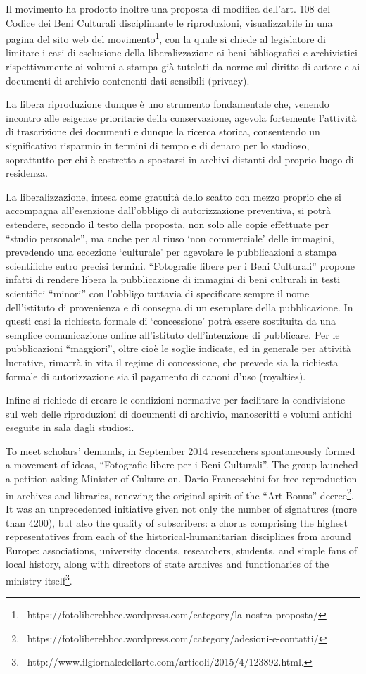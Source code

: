 \documentclass[amsthm,ebook]{saparticle}
\begin{document}
Il movimento ha prodotto inoltre una proposta di modifica dell’art. 108 del Codice dei Beni Culturali disciplinante le
riproduzioni, visualizzabile in una pagina del sito web del
movimento\footnote{\ https://fotoliberebbcc.wordpress.com/category/la-nostra-proposta/}, con la quale si chiede al
legislatore di limitare i casi di esclusione della liberalizzazione ai beni bibliografici e archivistici
rispettivamente ai volumi a stampa già tutelati da norme sul diritto di autore e ai documenti di archivio contenenti
dati sensibili (privacy). 

La libera riproduzione dunque è uno strumento fondamentale che, venendo incontro alle esigenze prioritarie della
conservazione, agevola fortemente l’attività di trascrizione dei documenti e dunque la ricerca storica, consentendo un
significativo risparmio in termini di tempo e di denaro per lo studioso, soprattutto per chi è costretto a spostarsi in
archivi distanti dal proprio luogo di residenza. 

La liberalizzazione, intesa come gratuità dello scatto con mezzo proprio che si accompagna all’esenzione dall’obbligo di
autorizzazione preventiva, si potrà estendere, secondo il testo della proposta, non solo alle copie effettuate per
“studio personale”, ma anche per al riuso ‘non commerciale’ delle immagini, prevedendo una eccezione ‘culturale’ per
agevolare le pubblicazioni a stampa scientifiche entro precisi termini. “Fotografie libere per i Beni Culturali”
propone infatti di rendere libera la pubblicazione di immagini di beni culturali in testi scientifici “minori” con
l’obbligo tuttavia di specificare sempre il nome dell’istituto di provenienza e di consegna di un esemplare della
pubblicazione. In questi casi la richiesta formale di ‘concessione’ potrà essere sostituita da una semplice
comunicazione online all’istituto dell’intenzione di pubblicare. Per le pubblicazioni “maggiori”, oltre cioè le soglie
indicate, ed in generale per attività lucrative, rimarrà in vita il regime di concessione, che prevede sia la richiesta
formale di autorizzazione sia il pagamento di canoni d’uso (royalties). 

Infine si richiede di creare le condizioni normative per facilitare la condivisione sul web delle riproduzioni di
documenti di archivio, manoscritti e volumi antichi eseguite in sala dagli studiosi. 

To meet scholars’ demands, in September 2014 researchers spontaneously formed a movement of ideas, “Fotografie libere
per i Beni Culturali”. The group launched a petition asking Minister of Culture on. Dario Franceschini for free
reproduction in archives and libraries, renewing the original spirit of the “Art Bonus”
decree\footnote{\ https://fotoliberebbcc.wordpress.com/category/adesioni-e-contatti/}. It was an unprecedented
initiative given not only the number of signatures (more than 4200), but also the quality of subscribers: a chorus
comprising the highest representatives from each of the historical-humanitarian disciplines from around Europe:
associations, university docents, researchers, students, and simple fans of local history, along with directors of
state archives and functionaries of the ministry
itself\footnote{\ http://www.ilgiornaledellarte.com/articoli/2015/4/123892.html.}.
\end{document}
